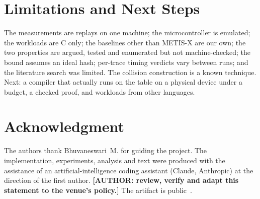 \documentclass[conference,10pt]{IEEEtran}
\newcommand{\authorfill}[1]{\textbf{[AUTHOR: #1]}}
\begin{document}
\section{Limitations and Next Steps}
The measurements are replays on one machine; the microcontroller is emulated; the workloads are C only; the baselines other than METIS-X are our own; the two properties are argued, tested and enumerated but not machine-checked; the bound assumes an ideal hash; per-trace timing verdicts vary between runs; and the literature search was limited. The collision construction is a known technique. Next: a compiler that actually runs on the table on a physical device under a budget, a checked proof, and workloads from other languages.

\ifdefined\anonymous
\else
\section*{Acknowledgment}
The authors thank Bhuvaneswari~M. for guiding the project. The implementation, experiments, analysis and text were produced with the assistance of an artificial-intelligence coding assistant (Claude, Anthropic) at the direction of the first author. \authorfill{review, verify and adapt this statement to the venue's policy.} The artifact is public~\cite{strata}.
\fi



\end{document}
